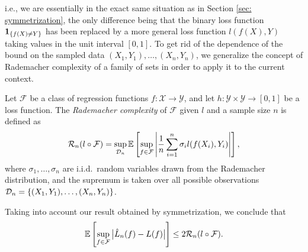 i.e., we are essentially in the exact same situation as in Section \ref{sec: symmetrization}, the only difference being that the binary loss function $\mathbf{1}_{\left\{f(X) \neq Y\right\}}$ has been replaced by a more general loss function $l(f(X), Y)$ taking values in the unit interval $[0, 1]$. To get rid of the dependence of the bound on the sampled data $(X_1, Y_1), \dots, (X_n, Y_n)$, we generalize the concept of Rademacher complexity of a family of sets in order to apply it to the current context.

\begin{definition}
\label{def: rademacher complexity for general loss}
Let $\mathcal{F}$ be a class of regression functions $f \colon \mathcal{X} \to \mathcal{Y}$, and let $h \colon \mathcal{Y} \times \mathcal{Y} \to [0, 1]$ be a loss function. The \emph{Rademacher complexity} of $\mathcal{F}$ given $l$ and a sample size $n$ is defined as
\[
    \mathcal{R}_n(l \circ \mathcal{F}) = \sup_{\mathcal{D}_n} \mathbb{E}\left[ \sup_{f \in \mathcal{F}} \abs{\frac{1}{n} \sum_{i=1}^n \sigma_i l(f(X_i), Y_i)}\right],
\]
where $\sigma_1, \dots, \sigma_n$ are i.i.d.\ random variables drawn from the Rademacher distribution, and the supremum is taken over all possible observations $\mathcal{D}_n = \left\{(X_1, Y_1), \dots, (X_n, Y_n)\right\}$.
\end{definition}
Taking into account our result obtained by symmetrization, we conclude that
\[
    \mathbb{E}\left[ \sup_{f \in \mathcal{F}} \big\lvert\hat L_n(f) - L(f)\big\rvert \right] \leq 2 \mathcal{R}_n(l \circ \mathcal{F}).
\]

